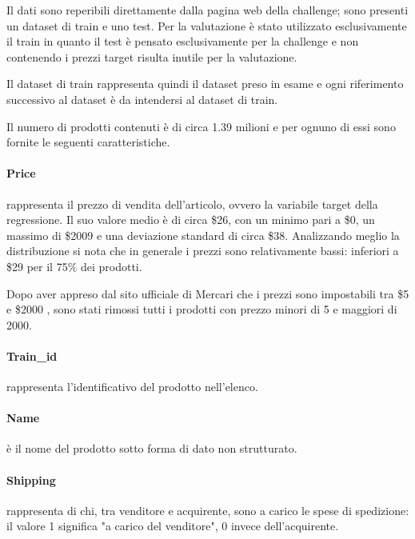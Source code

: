 
Il dati sono reperibili direttamente dalla pagina web della challenge; sono
presenti un dataset di train e uno test. Per la valutazione è stato utilizzato
esclusivamente il train in quanto il test è pensato esclusivamente per la
challenge e non contenendo i prezzi target risulta inutile per la valutazione.

Il dataset di train rappresenta quindi il dataset preso in esame e ogni
riferimento successivo al dataset è da intendersi al dataset di train.

Il numero di prodotti contenuti è di circa 1.39 milioni e per ognuno di essi
sono fornite le seguenti caratteristiche.

\paragraph{Price} rappresenta il prezzo di vendita dell'articolo, ovvero la
variabile target della regressione. Il suo valore medio è di circa \$26, con un
minimo pari a \$0, un massimo di \$2009 e una deviazione standard di circa \$38.
Analizzando meglio la distribuzione si nota che in generale i prezzi sono
relativamente bassi: inferiori a \$29 per il 75\% dei prodotti.

Dopo aver appreso dal sito ufficiale di Mercari che i prezzi sono impostabili
tra \$5 e \$2000 \cite{mercari-how-to-set-a-price}, sono stati rimossi tutti i prodotti con prezzo minori di 5 e maggiori di 2000.

\paragraph{Train\_id} rappresenta l'identificativo del prodotto nell'elenco.

\paragraph{Name} è il nome del prodotto sotto forma di dato non strutturato.

\paragraph{Shipping} rappresenta di chi, tra venditore e acquirente, sono a carico
le spese di spedizione: il valore 1 significa "a carico del
venditore", 0 invece dell'acquirente.

